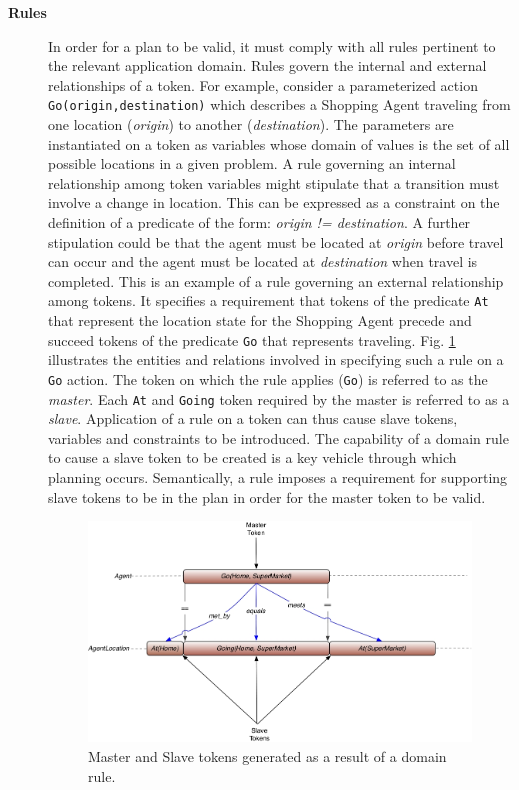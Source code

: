 \begin{description}
\item[\textbf{Rules}] In order for a plan to be valid, it must comply
  with all rules pertinent to the relevant application domain. Rules
  govern the internal and external relationships of a token. For
  example, consider a parameterized action
  \texttt{Go(origin,destination)} which describes a Shopping Agent
  traveling from one location (\textit{origin}) to another
  (\textit{destination}). The parameters are instantiated on a token
  as variables whose domain of values is the set of all possible
  locations in a given problem. A rule governing an internal
  relationship among token variables might stipulate that a transition
  must involve a change in location. This can be expressed as a
  constraint on the definition of a predicate of the form:
  \textit{origin != destination}. A further stipulation could be that
  the agent must be located at \textit{origin} before travel can occur
  and the agent must be located at \textit{destination} when travel is
  completed. This is an example of a rule governing an external
  relationship among tokens. It specifies a requirement that tokens of
  the predicate \texttt{At} that represent the location state for the
  Shopping Agent precede and succeed tokens of the predicate
  \texttt{Go} that represents traveling. Fig. \ref{fig:europapr:rules}
  illustrates the entities and relations involved in specifying such a
  rule on a \texttt{Go} action. The token on which the rule applies
  (\texttt{Go}) is referred to as the \emph{master}. Each \texttt{At}
  and \texttt{Going} token required by the master is referred to as a
  \emph{slave}.  Application of a rule on a token  can thus cause slave tokens, variables and constraints to
  be introduced.  The capability of a domain rule to cause a slave
  token to be created is a key vehicle through which planning
  occurs. Semantically, a rule imposes a requirement for supporting
  slave tokens to be in the plan in order for the master token to be
  valid.

  \begin{figure}[t]
    \centering
    \includegraphics[scale=2.5]{figs/europa-pr-rules.jpeg}
    \caption{\small Master and Slave tokens generated as a result of a domain rule.}
    \label{fig:europapr:rules}
  \end{figure}

\end{description}

